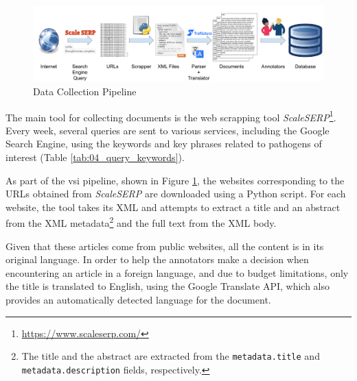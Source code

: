 

\label{vsi_data_collection}


\begin{figure}[h]
    \centering
    \includegraphics[width=\textwidth]{Figures/04/04_vsi_dataset_collection.png}
    \caption{\VSI{} Data Collection Pipeline}
    \label{fig:04_vsi_data_collection_pipeline}
\end{figure}


The main tool for collecting documents is the web scrapping tool \emph{ScaleSERP}\footnote{\url{https://www.scaleserp.com/}}. Every week, several queries are sent to various services, including the Google Search Engine, using the keywords and key phrases related to pathogens of interest (Table \ref{tab:04_query_keywords}).%


As part of the \gls{vsi} pipeline, shown in Figure \ref{fig:04_vsi_data_collection_pipeline}, the websites corresponding to the URLs obtained from \emph{ScaleSERP} are downloaded using a Python script. 
For each website, the tool \trafilatura{}  takes its XML and attempts to extract a title and  an abstract from the XML metadata\footnote{The title and the abstract are extracted from the \texttt{metadata.title} and \texttt{metadata.description} fields, respectively.} and the full text from the XML body.

Given that these articles come from public websites, all the content is in its original language.
In order to help the annotators make a decision when encountering an article in a foreign language, and due to budget limitations, only the title is translated to English, using the Google Translate API, which also provides an automatically detected language for the document. 

